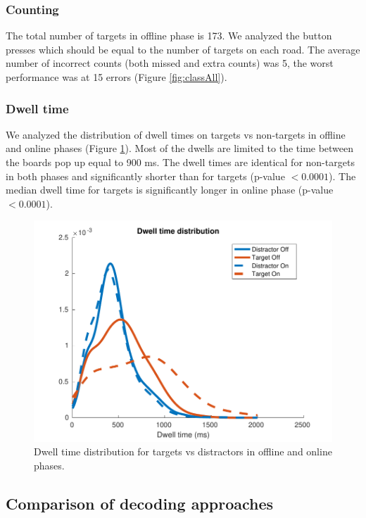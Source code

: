 \documentclass[12pt]{iopart}
\begin{document}
\subsubsection*{Counting}
The total number of targets in offline phase is 173.
We analyzed the button presses which should be equal to the number of targets
on each road.
The average number of incorrect counts (both missed and extra counts) was 5,
the worst performance was at 15 errors (Figure \ref{fig:classAll}).


\subsubsection*{Dwell time}
We analyzed the distribution of dwell times on targets vs non-targets
in offline and online phases (Figure \ref{fig:dwell}). 
Most of the dwells are limited to the time between the boards pop up equal to 900 ms.
The dwell times are identical for non-targets in both phases and significantly
shorter than for targets (p-value $< 0.0001$).
The median dwell time for targets is significantly longer in online phase (p-value $< 0.0001$).

\begin{figure}[!t]
    \includegraphics[trim={0cm 0cm 0cm 0cm},clip,width=0.6\columnwidth]{../images/DwelltimeDist_online_allmean.pdf}
    \caption{Dwell time distribution for targets vs distractors in offline and online phases.}
\label{fig:dwell}
\end{figure}

\subsection{Comparison of decoding approaches}
\end{document}
